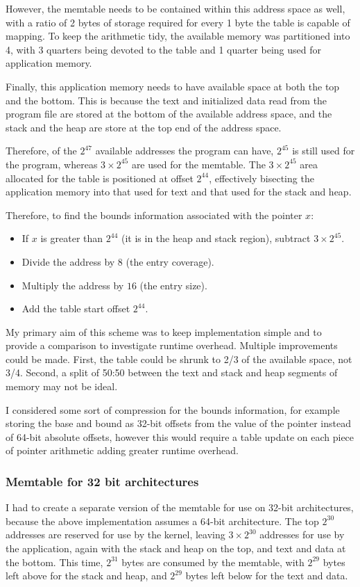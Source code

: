 However, the memtable needs to be contained within this address space as well, with a ratio of 2 bytes of storage required for every 1 byte the table is capable of mapping.
To keep the arithmetic tidy, the available memory was partitioned into 4, with 3 quarters being devoted to the table and 1 quarter being used for application memory.

Finally, this application memory needs to have available space at both the top and the bottom.
This is because the text and initialized data read from the program file are stored at the bottom of the available address space, and the stack and the heap are store at the top end of the address space.

Therefore, of the $2^{47}$ available addresses the program can have, $2^{45}$ is still used for the program, whereas $3\times 2^{45}$ are used for the memtable.
The $3\times 2^{45}$ area allocated for the table is positioned at offset $2^{44}$, effectively bisecting the application memory into that used for text and that used for the stack and heap.

Therefore, to find the bounds information associated with the pointer $x$:

\begin{itemize}
\item If $x$ is greater than $2^{44}$ (it is in the heap and stack region), subtract $3\times 2^{45}$.
\item Divide the address by $8$ (the entry coverage).
\item Multiply the address by $16$ (the entry size).
\item Add the table start offset $2^{44}$.
\end{itemize}

My primary aim of this scheme was to keep implementation simple and to provide a comparison to investigate runtime overhead.
Multiple improvements could be made.
First, the table could be shrunk to 2/3 of the available space, not 3/4.
Second, a split of 50:50 between the text and stack and heap segments of memory may not be ideal.

I considered some sort of compression for the bounds information, for example storing the base and bound as 32-bit offsets from the value of the pointer instead of 64-bit absolute offsets, however this would require a table update on each piece of pointer arithmetic adding greater runtime overhead.

\subsubsection{Memtable for 32 bit architectures}
I had to create a separate version of the memtable for use on 32-bit architectures, because the above implementation assumes a 64-bit architecture.
The top $2^{30}$ addresses are reserved for use by the kernel, leaving $3 \times 2^{30}$ addresses for use by the application, again with the stack and heap on the top, and text and data at the bottom.
This time, $2^{31}$ bytes are consumed by the memtable, with $2^{29}$ bytes left above for the stack and heap, and $2^{29}$ bytes left below for the text and data.
